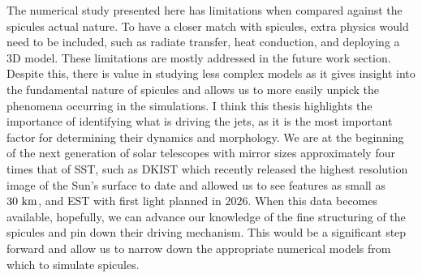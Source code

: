 \documentclass[12pt]{ociamthesis}
\begin{document}
%
The numerical study presented here has limitations when compared against the spicules actual nature. To have a closer match with spicules, extra physics would need to be included, such as radiate transfer, heat conduction, and deploying a 3D model. These limitations are mostly addressed in the future work section. Despite this, there is value in studying less complex models as it gives insight into the fundamental nature of spicules and allows us to more easily unpick the phenomena occurring in the simulations. I think this thesis highlights the importance of identifying what is driving the jets, as it is the most important factor for determining their dynamics and morphology. We are at the beginning of the next generation of solar telescopes with mirror sizes approximately four times that of SST, such as DKIST  which recently released the highest resolution image of the Sun's surface to date and allowed us to see features as small as $30~\rm{km}$, and EST with first light planned in $2026$. When this data becomes available, hopefully, we can advance our knowledge of the fine structuring of the spicules and pin down their driving mechanism. This would be a significant step forward and allow us to narrow down the appropriate numerical models from which to simulate spicules. 
\end{document}

